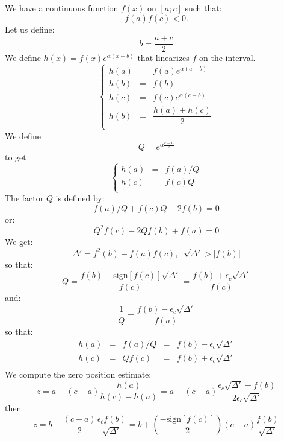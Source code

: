 \documentclass[aps,10pt]{revtex4}
\begin{document}
We have a continuous function $f(x)$ on $[a;c]$ such that:
$$f(a)f(c)<0.$$
Let us define:
$$
	b = \dfrac{a+c}{2}
$$
We define $h(x)=f(x)e^{\alpha(x-b)}$ that linearizes $f$ on the interval.
$$
\left\lbrace
\begin{array}{rcl}
	h(a) & = & f(a)e^{\alpha(a-b)}\\
	h(b) & = & f(b)\\
	h(c) & = & f(c) e^{\alpha(c-b)}\\
	h(b) & = & \dfrac{h(a)+h(c)}{2}\\
\end{array}
\right.
$$
We define
$$
Q = e^{\alpha\frac{c-a}{2}}
$$
to get
$$	
\left\lbrace
\begin{array}{rcl}
	h(a) & = & f(a)/Q\\
 	h(c) & = & f(c)Q\\
\end{array}
\right.
$$
The factor $Q$ is defined by:
$$
	f(a)/Q + f(c)Q - 2f(b) = 0
$$
or:
$$
	Q^2 f(c) - 2Qf(b) + f(a) = 0 
$$
We get:
$$
	\Delta' = f^2(b) - f(a)f(c), \;\; \sqrt{\Delta'} > |f(b)|
$$
so that:
$$
	Q = \dfrac{f(b) + \mathrm{sign}[ f(c) ] \sqrt{\Delta'}}{f(c)} = \dfrac{f(b) + \epsilon_c \sqrt{\Delta'}}{f(c)}
$$
and:
$$
	\dfrac{1}{Q} = \frac{f(b) - \epsilon_c \sqrt{\Delta'}}{f(a)}
$$
so that:
$$
\begin{array}{rcccl}
	h(a) & = & f(a)/Q & = & f(b) - \epsilon_c \sqrt{\Delta'}\\
	h(c) & = & Qf(c)  & = & f(b) + \epsilon_c \sqrt{\Delta'}\\
\end{array}
$$
We compute the zero position estimate:
$$
	z = a - (c-a) \dfrac{h(a)}{h(c)-h(a)} = a + (c-a) \dfrac{\epsilon_c \sqrt{\Delta'} - f(b)}{2 \epsilon_c \sqrt{\Delta'}}
$$
then
$$
	z = b - \dfrac{(c-a)}{2} \dfrac{\epsilon_c f(b)}{\sqrt{\Delta'}} = b + \left(\dfrac{-\mathrm{sign}[ f(c) ]}{2}\right) (c-a) \dfrac{f(b)}{\sqrt{\Delta'}}
$$
 
\end{document}
